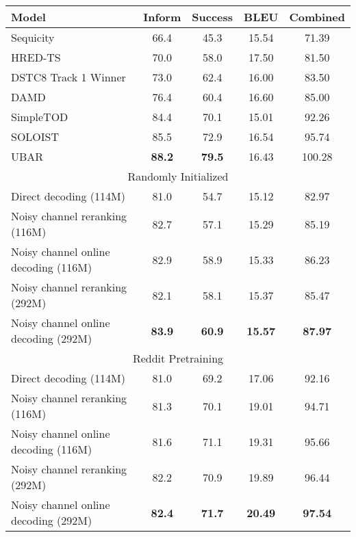 \documentclass[11pt,a4paper]{article}
\begin{document}
\begin{table*}[t]
    \centering
    \footnotesize
    \renewcommand{\arraystretch}{0.9}
    \begin{tabular}{lcccc}
        \toprule
        \textbf{Model}   & \textbf{Inform } & \textbf{Success } &
        \textbf{BLEU } &
        \textbf{Combined } \\ \midrule
        Sequicity \cite{lei2018sequicity} & 66.4 & 45.3 & 15.54 & 71.39\\
        HRED-TS \cite{peng2019teacher} & 70.0 & 58.0 & 17.50 & 81.50 \\
        DSTC8 Track 1 Winner \cite{ham2020end} & 73.0 & 62.4 & 16.00 & 83.50 \\
        DAMD \cite{zhang2019task} & 76.4 & 60.4 & 16.60 & 85.00 \\
        SimpleTOD \cite{hosseini2020simple} & 84.4 & 70.1 & 15.01 & 92.26 \\ 
        SOLOIST \cite{peng2020soloist} & 85.5 & 72.9 & 16.54 & 95.74 \\
        UBAR \cite{yang2020ubar} & \textbf{88.2} & \textbf{79.5} & 16.43 & 100.28 \\
        \midrule\multicolumn{5}{c}{Randomly Initialized} \\ \midrule
        Direct decoding (114M) & 81.0 & 54.7 & 15.12 & 82.97 \\
        Noisy channel reranking (116M) & 82.7 & 57.1 & 15.29 & 85.19\\
        Noisy channel online decoding (116M) & 82.9 & 58.9 & 15.33 & 86.23\\
        Noisy channel reranking (292M) & 82.1 & 58.1 & 15.37 & 85.47 \\
        Noisy channel online decoding (292M) & \textbf{83.9} & \textbf{60.9} & \textbf{15.57} & \textbf{87.97} \\
        \midrule\multicolumn{5}{c}{Reddit Pretraining} \\ \midrule
        Direct decoding (114M) & 81.0 & 69.2 & 17.06 & 92.16 \\
        Noisy channel reranking (116M) & 81.3 & 70.1 & 19.01 & 94.71\\
        Noisy channel online decoding (116M) & 81.6 & 71.1 & 19.31 & 95.66\\
        Noisy channel reranking (292M) & 82.2 & 70.9 & 19.89 & 96.44 \\
        Noisy channel online decoding (292M) & \textbf{82.4} & \textbf{71.7} & \textbf{20.49} & \textbf{97.54} \\

\end{tabular}
\end{table*}
\end{document}
